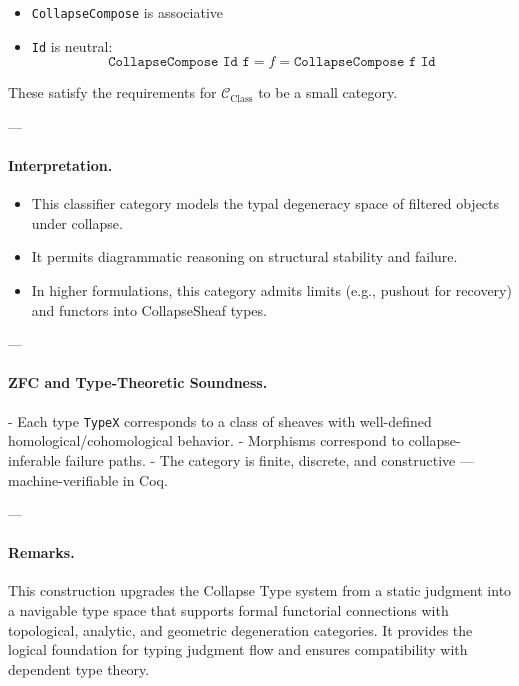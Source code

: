 \documentclass[11pt]{article}
\begin{document}
\begin{itemize}
  \item \texttt{CollapseCompose} is associative
  \item \texttt{Id} is neutral:  
    \[
    \texttt{CollapseCompose Id f} = f = \texttt{CollapseCompose f Id}
    \]
\end{itemize}

These satisfy the requirements for \(\mathcal{C}_{\text{Class}}\) to be a small category.

---

\paragraph{Interpretation.}

\begin{itemize}
  \item This classifier category models the typal degeneracy space of filtered objects under collapse.
  \item It permits diagrammatic reasoning on structural stability and failure.
  \item In higher formulations, this category admits limits (e.g., pushout for recovery) and functors into CollapseSheaf types.
\end{itemize}

---

\paragraph{ZFC and Type-Theoretic Soundness.}

- Each type \texttt{TypeX} corresponds to a class of sheaves with well-defined homological/cohomological behavior.
- Morphisms correspond to collapse-inferable failure paths.
- The category is finite, discrete, and constructive — machine-verifiable in Coq.

---

\paragraph{Remarks.}

This construction upgrades the Collapse Type system from a static judgment into a navigable type space  
that supports formal functorial connections with topological, analytic, and geometric degeneration categories.  
It provides the logical foundation for typing judgment flow and ensures compatibility with dependent type theory.
\end{document}
